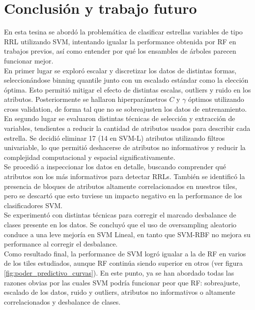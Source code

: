 \chapter{Conclusión y trabajo futuro}

En esta tesina se abordó la problemática de clasificar estrellas variables de tipo RRL utilizando SVM, intentando igualar la performance obtenida por RF en trabajos previos, así como entender por qué los ensambles de árboles parecen funcionar mejor. \\

En primer lugar se exploró escalar y discretizar los datos de distintas formas, seleccionándose binning quantile junto con un escalado estándar como la elección óptima. Esto permitió mitigar el efecto de distintas escalas, outliers y ruido en los atributos. Posteriormente se hallaron hiperparámetros $C$ y $\gamma$ óptimos utilizando cross validation, de forma tal que no se sobreajusten los datos de entrenamiento. \\

En segundo lugar se evaluaron distintas técnicas de selección y extracción de variables, tendientes a reducir la cantidad de atributos usados para describir cada estrella. Se decidió eliminar 17 (14 en SVM-L) atributos utilizando filtros univariable, lo que permitió deshacerse de atributos no informativos y reducir la complejidad computacional y espacial significativamente. \\

Se procedió a inspeccionar los datos en detalle, buscando comprender qué atributos son los más informativos para detectar RRLs. También se identificó la presencia de bloques de atributos altamente correlacionados en nuestros tiles, pero se descartó que esto tuviese un impacto negativo en la performance de los clasificadores SVM. \\

Se experimentó con distintas técnicas para corregir el marcado desbalance de clases presente en los datos. Se concluyó que el uso de oversampling aleatorio conduce a una leve mejoría en SVM Lineal, en tanto que SVM-RBF no mejora su performance al corregir el desbalance. \\

Como resultado final, la performance de SVM logró igualar a la de RF en varios de los tiles estudiados, aunque RF continúa siendo superior en otros (ver figura \ref{fig:poder_predictivo_curvas}). En este punto, ya se han abordado todas las razones obvias por las cuales SVM podría funcionar peor que RF: sobreajuste, escalado de los datos, ruido y outliers, atributos no informativos o altamente correlacionados y desbalance de clases. \\

